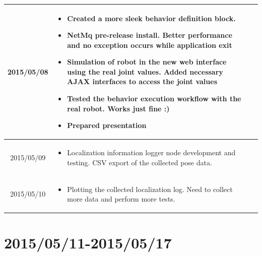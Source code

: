 \documentclass[11pt]{article} %
\begin{document}
\begin{center}
\begin{longtable}{ | c | p{6cm} | p{5cm} |}
  2015/05/08         & 
  \begin{itemize}
  \item Created a more sleek behavior definition block.
  \item NetMq pre-release install. Better performance and no exception occurs while application exit
  \item Simulation of robot in the new web interface using the real joint values. Added necessary AJAX interfaces to access the joint values
  \item Tested the behavior execution workflow with the real robot. Works just fine :)
  \item Prepared presentation
\end{itemize}   
  & 
\\
  										 \hline
  										 
	 2015/05/09         & 
  \begin{itemize}
  \item Localization information logger node development and testing. CSV export of the collected pose data.
  \end{itemize}
  & 
		\\					 \hline  	

	 2015/05/10         & 
  \begin{itemize}
  \item Plotting the collected localization log. Need to collect more data and perform more tests.
  \end{itemize}
  & 
		\\					 \hline  	
										 
  										   								 
    \end{longtable}
\end{center}

\newpage
\section{2015/05/11-2015/05/17}
\end{document}
